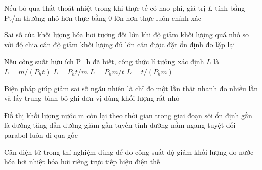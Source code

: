 \begin{ex}
Nếu bỏ qua thất thoát nhiệt trong khi thực tế có hao phí, giá trị $L$ tính bằng Pt/m thường
\choice
{nhỏ hơn thực}
{bằng 0}
{\True lớn hơn thực}
{luôn chính xác}
\end{ex}

\begin{ex}
Sai số của khối lượng hóa hơi tương đối lớn khi
\choice
{\True độ giảm khối lượng quá nhỏ so với độ chia cân}
{độ giảm khối lượng đủ lớn}
{cân được đặt ổn định}
{đo lặp lại}
\end{ex}

\begin{ex}
Nếu công suất hữu ích P_h đã biết, công thức lí tưởng xác định $L$ là
\choice
{$L=m/(P_ht)$}
{\True $L=P_ht/m$}
{$L=P_hm/t$}
{$L=t/(P_hm)$}
\end{ex}

\begin{ex}
Biện pháp giúp giảm sai số ngẫu nhiên là
\choice
{chỉ đo một lần thật nhanh}
{\True đo nhiều lần và lấy trung bình}
{bỏ ghi đơn vị}
{dùng khối lượng rất nhỏ}
\end{ex}

\begin{ex}
Đồ thị khối lượng nước m còn lại theo thời gian trong giai đoạn sôi ổn định gần là
\choice
{đường tăng dần}
{\True đường giảm gần tuyến tính}
{đường nằm ngang tuyệt đối}
{parabol luôn đi qua gốc}
\end{ex}

\begin{ex}
Cân điện tử trong thí nghiệm dùng để đo
\choice
{công suất}
{\True độ giảm khối lượng do nước hóa hơi}
{nhiệt hóa hơi riêng trực tiếp}
{hiệu điện thế}
\end{ex}

